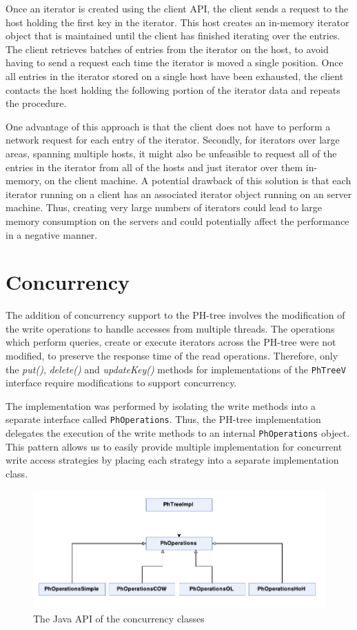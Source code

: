 \documentclass[11pt,a4paper]{globis-book}
\begin{document}
Once an iterator is created using the client API, the client sends a request to the host holding the first key in the iterator. This host creates an in-memory iterator object that is maintained until the client has finished iterating over the entries. The client retrieves batches of entries from the iterator on the host, to avoid having to send a request each time the iterator is moved a single position. Once all entries in the iterator stored on a single host have been exhausted, the client contacts the host holding the following portion of the iterator data and repeats the procedure. 

One advantage of this approach is that the client does not have to perform a network request for each entry of the iterator. Secondly, for iterators over large areas, spanning multiple hosts, it might also be unfeasible to request all of the entries in the iterator from all of the hosts and just iterator over them in-memory, on the client machine. A potential drawback of this solution is that each iterator running on a client has an associated iterator object running on an server machine. Thus, creating very large numbers of iterators could lead to large memory consumption on the servers and could potentially affect the performance in a negative manner.

\section{Concurrency}

The addition of concurrency support to the PH-tree involves the modification of the write operations to handle accesses from multiple threads. The operations which perform queries, create or execute iterators across the PH-tree were not modified, to preserve the response time of the read operations. Therefore, only the \textit{put()}, \textit{delete()} and \textit{updateKey()} methods for implementations of the \texttt{PhTreeV} interface require modifications to support concurrency. 

The implementation was performed by isolating the write methods into a separate interface called \texttt{PhOperations}. Thus, the PH-tree implementation delegates the execution of the write methods to an internal \texttt{PhOperations} object. This pattern allows us to easily provide multiple implementation for concurrent write access strategies by placing each strategy into a separate implementation class. 

\begin{figure}[h]
    \centering 
    \includegraphics[scale=1]{images/PH-tree-concurrency}
    \caption{The Java API of the concurrency classes}
    \label{fig:Concurrency-classes}
\end{figure}
\end{document}

